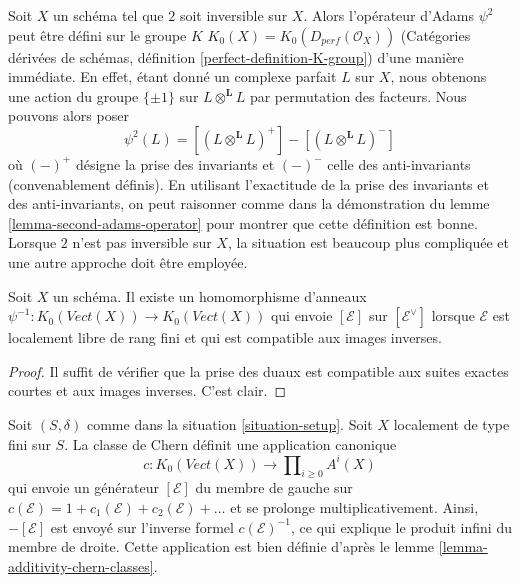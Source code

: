 \begin{remark}
\label{remark-adams-derived}
Soit $X$ un schéma tel que $2$ soit inversible sur $X$.
Alors l'opérateur d'Adams $\psi^2$ peut être défini sur le groupe $K$
$K_0(X) = K_0(D_{perf}(\mathcal{O}_X))$
(Catégories dérivées de schémas, définition \ref{perfect-definition-K-group})
d'une manière immédiate.
En effet, étant donné un complexe parfait $L$ sur $X$, nous obtenons une action
du groupe $\{\pm 1\}$ sur $L \otimes^\mathbf{L} L$ par permutation
des facteurs. Nous pouvons alors poser
$$
\psi^2(L) = [(L \otimes^\mathbf{L} L)^+] -
[(L \otimes^\mathbf{L} L)^-]
$$
où $(-)^+$ désigne la prise des invariants et $(-)^-$ celle des
anti-invariants (convenablement définis).
En utilisant l'exactitude de la prise des invariants et des anti-invariants, on peut
raisonner comme dans la démonstration du lemme \ref{lemma-second-adams-operator}
pour montrer que cette définition est bonne.
Lorsque $2$ n'est pas inversible sur $X$, la situation est beaucoup plus
compliquée et une autre approche doit être employée.
\end{remark}

\begin{lemma}
\label{lemma-minus-adams-operator}
Soit $X$ un schéma. Il existe un homomorphisme d'anneaux
$\psi^{-1} : K_0(\textit{Vect}(X)) \to K_0(\textit{Vect}(X))$
qui envoie $[\mathcal{E}]$ sur $[\mathcal{E}^\vee]$
lorsque $\mathcal{E}$ est localement libre de rang fini
et qui est compatible aux images inverses.
\end{lemma}

\begin{proof}
Il suffit de vérifier que la prise des duaux est compatible aux
suites exactes courtes et aux images inverses. C'est clair.
\end{proof}

\begin{remark}
\label{remark-chern-classes-K}
Soit $(S, \delta)$ comme dans la situation \ref{situation-setup}.
Soit $X$ localement de type fini sur $S$. La classe de Chern
définit une application canonique
$$
c : K_0(\textit{Vect}(X)) \longrightarrow \prod\nolimits_{i \geq 0} A^i(X)
$$
qui envoie un générateur $[\mathcal{E}]$ du membre de gauche sur
$c(\mathcal{E}) = 1 + c_1(\mathcal{E}) + c_2(\mathcal{E}) + \ldots$
et se prolonge multiplicativement. Ainsi, $-[\mathcal{E}]$ est envoyé sur
l'inverse formel $c(\mathcal{E})^{-1}$, ce qui explique le
produit infini du membre de droite. Cette application est bien définie d'après le
lemme \ref{lemma-additivity-chern-classes}.
\end{remark}

